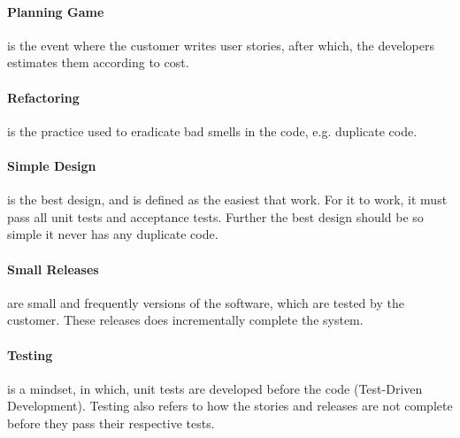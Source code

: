 \paragraph{Planning Game} is the event where the customer writes user stories, after which, the developers estimates them according to cost.

\paragraph{Refactoring} is the practice used to eradicate bad smells in the code, e.g. duplicate code.


\paragraph{Simple Design} is the best design, and is defined as the easiest that work.
For it to work, it must pass all unit tests and acceptance tests.
Further the best design should be so simple it never has any duplicate code.


\paragraph{Small Releases} are small and frequently versions of the software, which are tested by the customer.
These releases does incrementally complete the system.

\paragraph{Testing} is a mindset, in which, unit tests are developed before the code (Test-Driven Development).
Testing also refers to how the stories and releases are not complete before they pass their respective tests.

